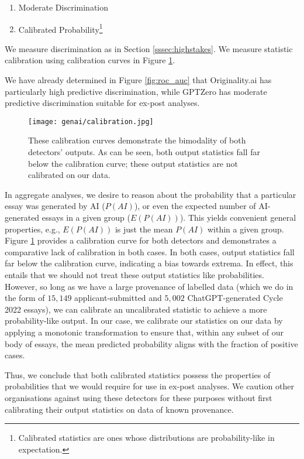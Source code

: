 \begin{enumerate}
    \item Moderate Discrimination
    \item Calibrated Probability\footnote{Calibrated statistics are ones whose distributions are probability-like in expectation.}
\end{enumerate}

We measure discrimination as in Section \ref{sssec:highstakes}. We measure statistic calibration using calibration curves in Figure \ref{fig:calibration}.

We have already determined in Figure \ref{fig:roc_auc} that Originality.ai has particularly high predictive discrimination, while GPTZero has moderate predictive discrimination suitable for ex-post analyses.

\begin{figure}[htb]
  \centering
  \texttt{[image: genai/calibration.jpg]}
  \caption{These calibration curves demonstrate the bimodality of both detectors' outputs. As can be seen, both output statistics fall far below the calibration curve; these output statistics are not calibrated on our data.}
  \label{fig:calibration}
\end{figure}

In aggregate analyses, we desire to reason about the probability that a particular essay was generated by AI ($P(AI)$), or even the expected number of AI-generated essays in a given group ($E(P(AI))$). This yields convenient general properties, e.g., $E(P(AI))$ is just the mean $P(AI)$ within a given group. Figure \ref{fig:calibration} provides a calibration curve for both detectors and demonstrates a comparative lack of calibration in both cases. In both cases, output statistics fall far below the calibration curve, indicating a bias towards extrema. In effect, this entails that we should not treat these output statistics like probabilities. However, so long as we have a large provenance of labelled data (which we do in the form of $15,149$ applicant-submitted and $5,002$ ChatGPT-generated Cycle 2022 essays), we can calibrate an uncalibrated statistic to achieve a more probability-like output. In our case, we calibrate our statistics on our data by applying a monotonic transformation to ensure that, within any subset of our body of essays, the mean predicted probability aligns with the fraction of positive cases.

Thus, we conclude that both calibrated statistics possess the properties of probabilities that we would require for use in ex-post analyses. We caution other organisations against using these detectors for these purposes without first calibrating their output statistics on data of known provenance.

